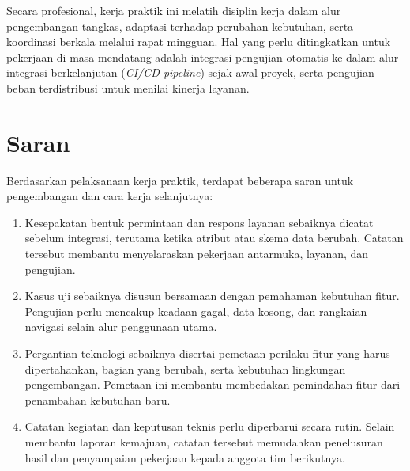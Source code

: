 Secara profesional, kerja praktik ini melatih disiplin kerja dalam alur pengembangan tangkas, adaptasi terhadap perubahan kebutuhan, serta koordinasi berkala melalui rapat mingguan. Hal yang perlu ditingkatkan untuk pekerjaan di masa mendatang adalah integrasi pengujian otomatis ke dalam alur integrasi berkelanjutan (\textit{CI/CD pipeline}) sejak awal proyek, serta pengujian beban terdistribusi untuk menilai kinerja layanan.

\section{Saran}
Berdasarkan pelaksanaan kerja praktik, terdapat beberapa saran untuk pengembangan dan cara kerja selanjutnya:
\begin{enumerate}[label=\arabic*)]
\item Kesepakatan bentuk permintaan dan respons layanan sebaiknya dicatat sebelum integrasi, terutama ketika atribut atau skema data berubah. Catatan tersebut membantu menyelaraskan pekerjaan antarmuka, layanan, dan pengujian.
\item Kasus uji sebaiknya disusun bersamaan dengan pemahaman kebutuhan fitur. Pengujian perlu mencakup keadaan gagal, data kosong, dan rangkaian navigasi selain alur penggunaan utama.
\item Pergantian teknologi sebaiknya disertai pemetaan perilaku fitur yang harus dipertahankan, bagian yang berubah, serta kebutuhan lingkungan pengembangan. Pemetaan ini membantu membedakan pemindahan fitur dari penambahan kebutuhan baru.
\item Catatan kegiatan dan keputusan teknis perlu diperbarui secara rutin. Selain membantu laporan kemajuan, catatan tersebut memudahkan penelusuran hasil dan penyampaian pekerjaan kepada anggota tim berikutnya.
\end{enumerate}
